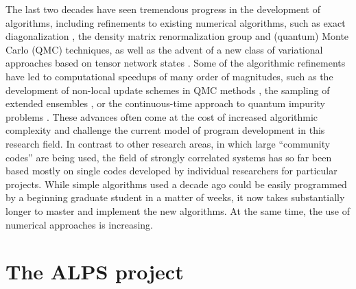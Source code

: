 \documentclass[12pt]{iopart}
\begin{document}
The last two decades have seen tremendous progress in the development of
algorithms, including refinements to existing numerical algorithms, such as exact diagonalization \cite{lanczos},
the density matrix renormalization group \cite{White1992,Schollwock2005,Daley2004,White2004} and (quantum) 
Monte Carlo (QMC) techniques, as well as the advent of a new class of variational approaches based on 
tensor network states \cite{vidal1,vidal2,Verstraete04,Murg07,vidal07}. 
Some of the algorithmic refinements have led to computational speedups of many order of magnitudes, such as 
the development of non-local update schemes \cite{Swendsen87,Wolff89} in QMC methods \cite{Evertz93,Prokofev98A,Sandvik99,Todo01,looper,Sylyuasen, Evertz03,Alet2005}, 
the sampling of extended ensembles \cite{Wang01,Wang01b,Troyer03,Trebst04,Katzgraber06,Wessel07},
or the continuous-time approach to quantum impurity problems \cite{Rubtsov04,Rubtsov05,Werner06,Werner06Kondo, Gull08_ctaux}.
These advances often come at the cost of increased algorithmic
complexity and challenge the current model of program development in
this research field. In contrast to other research areas, in which
large ``community codes'' are being used, the field of strongly
correlated systems has so far been based mostly on single codes developed by
individual researchers for particular projects. While simple
algorithms used a decade ago could be easily programmed by a beginning
graduate student in a matter of weeks, it now takes substantially
longer to master and implement the new algorithms. At the same time, the use of numerical approaches is increasing. 

\section{The ALPS project}
\end{document}
